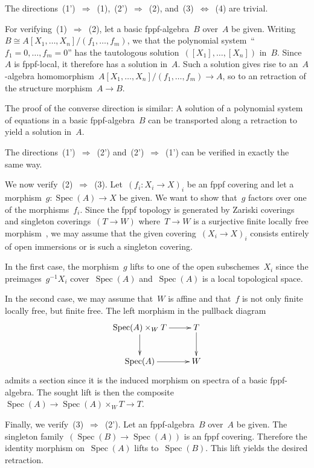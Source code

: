 \documentclass[10pt,reqno,a4paper]{amsbook}
\makeatletter
\theoremstyle{definition}
\theoremstyle{plain}
\theoremstyle{remark}
\DeclareMathOperator{\Spec}{Spec}
\newcommand{\?}{\,{:}\,}
\renewcommand{\_}{\mathpunct{.}\,}
\newcommand{\stacksproject}[1]{\cite[{\href{http://stacks.math.columbia.edu/tag/#1}{Tag~#1}}]{stacks-project}}
\renewenvironment{proof}[1][\proofname]{\par
  \pushQED{\qed}%
  \normalfont \topsep6\p@\@plus6\p@\relax
  \trivlist
  \item[\hskip\labelsep
        \itshape
    #1\@addpunct{.}]\ignorespaces
}{%
  \popQED\endtrivlist\@endpefalse
}
\makeatother
\begin{document}
\begin{proof}The directions~(1')~$\Rightarrow$~(1),~(2')~$\Rightarrow$~(2),
and~(3)~$\Leftrightarrow$~(4) are trivial.

For verifying~(1)~$\Rightarrow$~(2), let a basic fppf-algebra~$B$ over~$A$ be
given. Writing~$B \cong A[X_1,\ldots,X_n]/(f_1,\ldots,f_m)$, we that the
polynomial system~``$f_1 = 0, \ldots, f_m = 0$'' has the tautologous
solution~$([X_1],\ldots,[X_n])$ in~$B$. Since~$A$ is fppf-local, it therefore
has a solution in~$A$. Such a solution gives rise to an~$A$-algebra
homomorphism~$A[X_1,\ldots,X_n]/(f_1,\ldots,f_m) \to A$, so to an retraction of
the structure morphism~$A \to B$.

The proof of the converse direction is similar: A solution of a polynomial
system of equations in a basic fppf-algebra~$B$ can be transported along a
retraction to yield a solution in~$A$.

The directions~(1')~$\Rightarrow$~(2') and~(2')~$\Rightarrow$~(1') can be
verified in exactly the same way.

We now verify~(2)~$\Rightarrow$~(3). Let~$(f_i : X_i \to X)_i$ be an fppf
covering and let a morphism~$g : \Spec(A) \to X$ be given. We want to show
that~$g$ factors over one of the morphisms~$f_i$. Since the fppf topology is
generated by Zariski coverings and singleton coverings~$(T \to W)$ where~$T \to
W$ is a surjective finite locally free morphism~\stacksproject{05WN}, we may
assume that the given covering~$(X_i \to X)_i$ consists entirely of open
immersions or is such a singleton covering.

In the first case, the morphism~$g$ lifts to one of the open subschemes~$X_i$
since the preimages~$g^{-1}X_i$ cover~$\Spec(A)$ and~$\Spec(A)$ is a local
topological space.

In the second case, we may assume that~$W$ is affine and that~$f$ is not only
finite locally free, but finite free. The left morphism in the pullback diagram
\[ \xymatrix{
  \Spec(A) \times_W T \ar[r]\ar[d] & T \ar[d] \\
  \Spec(A) \ar[r] & W
} \]
admits a section since it is the induced morphism on spectra of a basic
fppf-algebra. The sought lift is then the composite~$\Spec(A) \to \Spec(A)
\times_W T \to T$.

Finally, we verify~(3)~$\Rightarrow$~(2'). Let an fppf-algebra~$B$ over~$A$ be
given. The singleton family~$(\Spec(B) \to \Spec(A))$ is an fppf covering.
Therefore the identity morphism on~$\Spec(A)$ lifts to~$\Spec(B)$. This lift
yields the desired retraction.
\end{proof}
\end{document}
